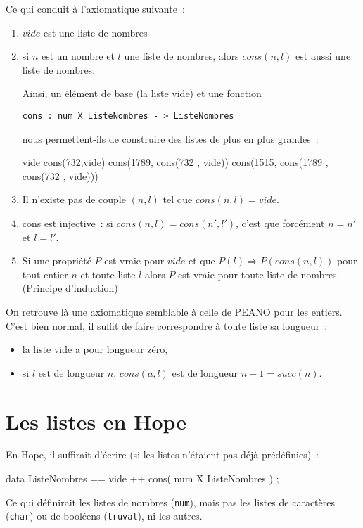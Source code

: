 Ce qui conduit à l'axiomatique suivante~:
\begin{enumerate}
\item $vide$ est une liste de nombres
\item si $n$ est un nombre et $l$ une liste de nombres, 
	alors $cons(n , l)$ est aussi une liste de nombres.

Ainsi, un élément de base (la liste vide) et une fonction 
\begin{verbatim}
cons : num X ListeNombres - > ListeNombres
\end{verbatim}
 nous permettent-ils de construire
des listes de plus en plus grandes~:

\begin{verbatimtab}
vide
cons(732,vide)
cons(1789, cons(732 , vide))
cons(1515, cons(1789 , cons(732 , vide))) 
\end{verbatimtab}
\item Il n'existe pas de couple $(n,l)$ tel que $cons(n , l) = vide$.
\item  cons est injective~: si $cons(n,l) = cons(n',l')$, c'est que 
forcément $n=n'$ et $l=l'$.
\item Si une propriété $P$ est vraie pour $vide$
	 et que $P(l) \Rightarrow  P( cons(n,l) )$ pour tout entier $n$ et toute liste $l$  
	alors $P$ est vraie pour toute liste de nombres.	(Principe d'induction)
\end{enumerate}
On retrouve là une axiomatique semblable à celle de PEANO pour les entiers. C'est bien normal, il suffit de faire correspondre à toute liste sa longueur~: 
\begin{itemize}
\item la liste vide a pour longueur zéro, 
\item si $l$ est de longueur $n$,  $cons( a,l )$ est de longueur $n+1 = succ(n)$.
\end{itemize}

\section{Les listes en Hope}

En Hope, il suffirait d'écrire (si les listes n'étaient pas déjà prédéfinies)~:

\begin{verbatimtab}
data ListeNombres == vide ++ cons( num X ListeNombres ) ;
\end{verbatimtab}

Ce qui définirait les listes de nombres (\texttt{num}), mais pas les
listes de caractères (\texttt{char}) ou de booléens (\texttt{truval}),
ni les autres.



